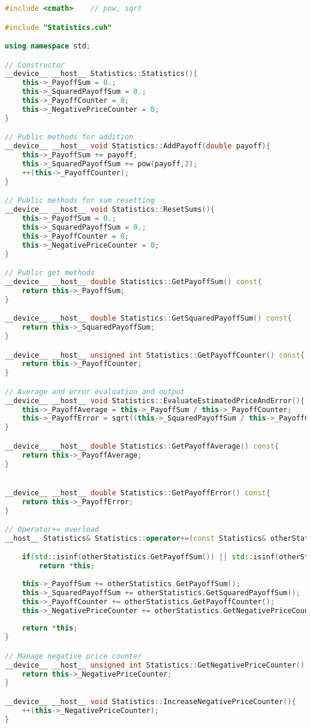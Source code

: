\begin{lstlisting}[language=C++, caption={\texttt{libraries/CoreLibraries/Statistics/Statistics.cu}}]
#include <cmath>	// pow, sqrt

#include "Statistics.cuh"

using namespace std;

// Constructor
__device__ __host__ Statistics::Statistics(){
	this->_PayoffSum = 0.;
	this->_SquaredPayoffSum = 0.;
	this->_PayoffCounter = 0;
	this->_NegativePriceCounter = 0;
}

// Public methods for addition
__device__ __host__ void Statistics::AddPayoff(double payoff){
	this->_PayoffSum += payoff;
	this->_SquaredPayoffSum += pow(payoff,2);
	++(this->_PayoffCounter);
}

// Public methods for sum resetting
__device__ __host__ void Statistics::ResetSums(){
	this->_PayoffSum = 0.;
	this->_SquaredPayoffSum = 0.;
	this->_PayoffCounter = 0;
	this->_NegativePriceCounter = 0;
}

// Public get methods
__device__ __host__ double Statistics::GetPayoffSum() const{
	return this->_PayoffSum;
}

__device__ __host__ double Statistics::GetSquaredPayoffSum() const{
	return this->_SquaredPayoffSum;
}

__device__ __host__ unsigned int Statistics::GetPayoffCounter() const{
	return this->_PayoffCounter;
}

// Average and error evaluation and output
__device__ __host__ void Statistics::EvaluateEstimatedPriceAndError(){
	this->_PayoffAverage = this->_PayoffSum / this->_PayoffCounter;
	this->_PayoffError = sqrt((this->_SquaredPayoffSum / this->_PayoffCounter - pow(this->_PayoffAverage,2))/ this->_PayoffCounter);
}

__device__ __host__ double Statistics::GetPayoffAverage() const{
	return this->_PayoffAverage;
}


__device__ __host__ double Statistics::GetPayoffError() const{
	return this->_PayoffError;
}

// Operator+= overload
__host__ Statistics& Statistics::operator+=(const Statistics& otherStatistics){

	if(std::isinf(otherStatistics.GetPayoffSum()) || std::isinf(otherStatistics.GetSquaredPayoffSum()))
		return *this;
	
	this->_PayoffSum += otherStatistics.GetPayoffSum();
	this->_SquaredPayoffSum += otherStatistics.GetSquaredPayoffSum();
	this->_PayoffCounter += otherStatistics.GetPayoffCounter();
	this->_NegativePriceCounter += otherStatistics.GetNegativePriceCounter();
	
	return *this;
}

// Manage negative price counter
__device__ __host__ unsigned int Statistics::GetNegativePriceCounter() const{
	return this->_NegativePriceCounter;
}

__device__ __host__ void Statistics::IncreaseNegativePriceCounter(){
	++(this->_NegativePriceCounter);
}
\end{lstlisting}

